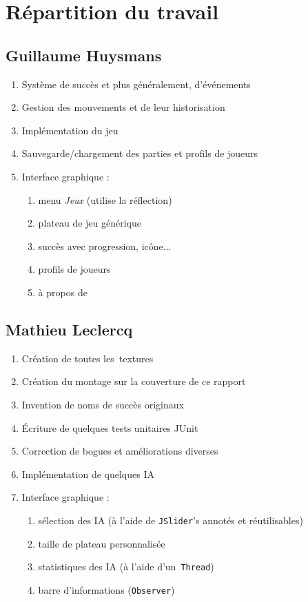 \section{Répartition du travail}

\subsection{Guillaume Huysmans}
\begin{enumerate}
	\item Système de succès et plus généralement, d'événements
    \item Gestion des mouvements et de leur historisation
    \item Implémentation du jeu \oth
    \item Sauvegarde/chargement des parties et profils de joueurs
    \item Interface graphique :
    \begin{enumerate}
        \item menu \textit{Jeux} (utilise la réflection)
        \item plateau de jeu générique
        \item succès avec progression, icône...
        \item profils de joueurs
        \item à propos de
    \end{enumerate}
\end{enumerate}

\subsection{Mathieu Leclercq}
\begin{enumerate}
	\item Création de toutes les~textures
    \item Création du montage sur la couverture de ce rapport
    \item Invention de noms de succès originaux
    \item Écriture de quelques tests unitaires JUnit
    \item Correction de bogues et améliorations diverses
    \item Implémentation de quelques IA
	\item Interface graphique : 
    \begin{enumerate}
        \item sélection des IA (à l'aide de \texttt{JSlider}'s annotés et réutilisables)
        \item taille de plateau personnalisée
        \item statistiques des IA (à l'aide d'un~\texttt{Thread})
        \item barre d'informations (\texttt{Observer})
    \end{enumerate}
\end{enumerate}
